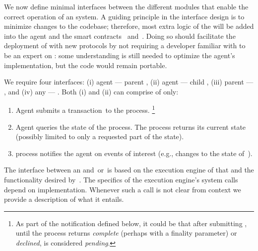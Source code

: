 We now define minimal interfaces between the different modules that enable the correct operation of an \nameFull system.
A guiding principle in the interface design is to minimize changes to the \smr codebase; therefore, most extra logic of the \nameAbbr will be added into the \nameAbbr agent and the smart contracts \sa~and~\gw. Doing so should facilitate the deployment of \nameAbbr with new \smr protocols by not requiring a developer familiar with \nameAbbr to be an expert on \smr: some understanding is still needed to optimize the agent's implementation, but the \smr code would remain portable.

We require four interfaces: (i) \nameAbbr agent --- parent \smr, (ii) \nameAbbr agent --- child \smr, (iii) parent \smr --- \sa, and (iv) any \smr --- \gw. Both (i) and (ii) can comprise of only:
\begin{enumerate}
    \item Agent submits a transaction~\tx to the \smr process.%
    \footnote{As part of the notification defined below, it could be that after submitting \tx, until the \smr process returns \textit{complete} (perhaps with a finality parameter) or \textit{declined}, \tx is considered \textit{pending}.}
    \item Agent queries the state of the \smr process. The \smr process returns its current state (possibly limited to only a requested part of the state).
    \item \smr process notifies the agent on events of interest (e.g., changes to the state of~\sa).
\end{enumerate}

The interface between an \smr and~\sa or~\gw is based on the execution engine of that \smr and the functionality desired by~\sa. The specifics of the execution engine's system calls depend on implementation. Whenever such a call is not clear from context we provide a description of what it entails. \\


